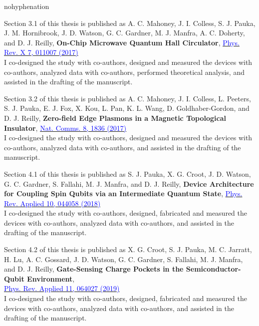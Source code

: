 \begin{hyphenrules}{nohyphenation}
\begin{sloppypar}
      \noindent
      Section 3.1 of this thesis is published as A. C. Mahoney, J. I. Colless, S. J. Pauka, J. M. Hornibrook, J. D. Watson, G. C. Gardner, M. J. Manfra, A. C. Doherty, and D. J. Reilly,
      \textbf{On-Chip Microwave Quantum Hall Circulator},
      \href{https://doi.org/\detokenize{10.1103/PhysRevX.7.011007}}{\textcolor{blue}{Phys. Rev. X 7, 011007 (2017)}} \\
      I co-designed the study with co-authors, designed and measured the devices with co-authors, analyzed data with co-authors, performed theoretical analysis, and assisted in the drafting of the manuscript.

      \noindent
      Section 3.2 of this thesis is published as A. C. Mahoney, J. I. Colless, L. Peeters, S. J. Pauka, E. J. Fox, X. Kou, L. Pan, K. L. Wang, D. Goldhaber-Gordon, and D. J. Reilly,
      \textbf{Zero-field Edge Plasmons in a Magnetic Topological Insulator},
      \href{https://doi.org/\detokenize{10.1038/s41467-017-01984-5}}{\textcolor{blue}{Nat. Comms. 8, 1836 (2017)}} \\
      I co-designed the study with co-authors, designed and measured the devices with co-authors, analyzed data with co-authors, and assisted in the drafting of the manuscript.

      \noindent
      Section 4.1 of this thesis is published as S. J. Pauka, X. G. Croot, J. D. Watson, G. C. Gardner, S. Fallahi, M. J. Manfra, and D. J. Reilly,
      \textbf{Device Architecture for Coupling Spin Qubits via an Intermediate Quantum State},
      \href{https://doi.org/\detokenize{10.1103/PhysRevApplied.10.044058}}{\textcolor{blue}{Phys. Rev. Applied 10, 044058 (2018)}} \\
      I co-designed the study with co-authors, designed, fabricated and measured the devices with co-authors, analyzed data with co-authors, and assisted in the drafting of the manuscript.

      \noindent
      Section 4.2 of this thesis is published as X. G. Croot, S. J. Pauka, M. C. Jarratt, H. Lu, A. C. Gossard, J. D. Watson, G. C. Gardner, S. Fallahi, M. J. Manfra, and D. J. Reilly,
      \textbf{Gate-Sensing Charge Pockets in the Semiconductor-Qubit Environment}, \\
      \href{https://doi.org/\detokenize{10.1103/PhysRevApplied.11.064027}}{\textcolor{blue}{Phys. Rev. Applied 11, 064027 (2019)}} \\
      I co-designed the study with co-authors, designed, fabricated and measured the devices with co-authors, analyzed data with co-authors, and assisted in the drafting of the manuscript.


\end{sloppypar}
\end{hyphenrules}
